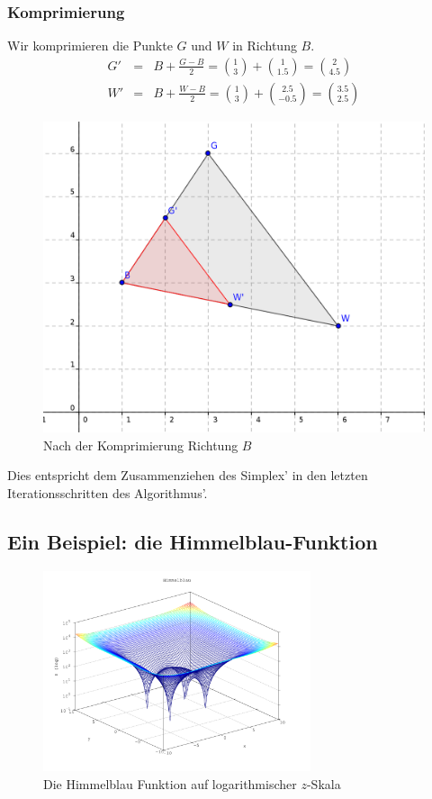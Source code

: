 \documentclass[naustrian]{article}
\begin{document}
{\subsubsection{Komprimierung}

Wir komprimieren die Punkte $G$ und $W$ in Richtung $B$.
\begin{eqnarray*}
    G' & = & B+\frac{G-B}{2}=\binom{1}{3}+\binom{1}{1.5}=\binom{2}{4.5}\\
    W' & = & B+\frac{W-B}{2}=\binom{1}{3}+\binom{2.5}{-0.5}=\binom{3.5}{2.5}
\end{eqnarray*}

\begin{figure}[H]
    \centering
    \includegraphics{nelder_mead/triangle_compress}
    \caption{Nach der Komprimierung Richtung $B$}
\end{figure}

Dies entspricht dem Zusammenziehen des Simplex' in den letzten Iterationsschritten
des Algorithmus'.


\subsection{Ein Beispiel: die Himmelblau-Funktion}

\begin{figure}[H]
    \centering
    \includegraphics[width=0.7\textwidth]{nelder_mead/himmelblau}
    \caption{Die Himmelblau Funktion auf logarithmischer $z$-Skala}
\end{figure}

}
\end{document}
